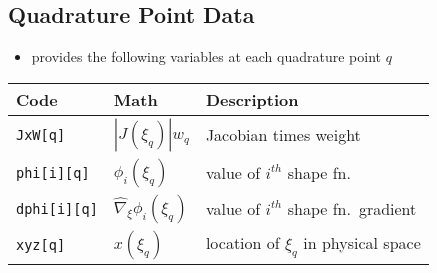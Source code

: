 \subsection*{\libMesh{} Quadrature Point Data}
\begin{frame}[t]
	\begin{block}{}
	\begin{itemize}    
	\item{ \libMesh{} provides the following variables at
	  each quadrature point $q$
	}
	\end{itemize}
	\end{block}
	
	\begin{center}
	  \renewcommand{\arraystretch}{1.3}
	\begin{tabular}{|l|l|l|} \hline
	  \textbf{Code} & \textbf{Math} & \textbf{Description} \\ \hline
	  \texttt{JxW[q]}
	  & $|J(\xi_q)| w_q$
	  & Jacobian times weight
	  \\ \hline
	  \texttt{phi[i][q]}
	  & $\phi_i(\xi_{q})$
	  & value of $i^{th}$ shape fn.\
	  \\ \hline
	  \texttt{dphi[i][q]}
	  & $\hat{\nabla}_{\!\xi} \phi_i (\xi_q)$
	  & value of $i^{th}$ shape fn.\ gradient
	  \\ \hline
	  \texttt{xyz[q]}
	  & $x(\xi_q)$
	  & location of $\xi_q$ in physical space
	  \\ \hline
	  \end{tabular}
	\end{center}
	  
\end{frame}
